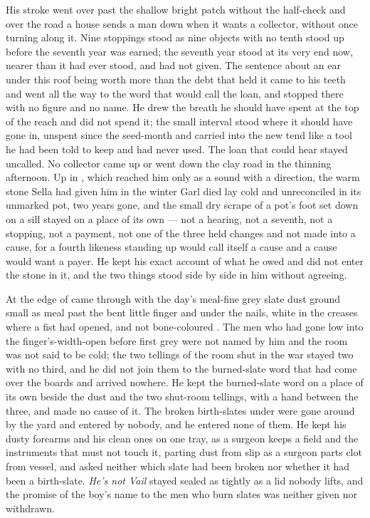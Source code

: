 His stroke went over  past the shallow bright patch without the half-check and over the road a house sends a man down when it wants a collector, without once turning along it. Nine stoppings stood as nine objects with no tenth stood up before the seventh year was earned; the seventh year stood at its very end now, nearer than it had ever stood, and had not given. The sentence about an ear under this roof being worth more than the debt that held it came to his teeth and went all the way to the word that would call the loan, and stopped there with no figure and no name. He drew the breath he should have spent at the top of the reach and did not spend it; the small interval stood where it should have gone in, unspent since the seed-month and carried into the new tend like a tool he had been told to keep and had never used. The loan that could hear stayed uncalled. No collector came up or went down the clay road in the thinning afternoon. Up in , which reached him only as a sound with a direction, the warm stone Sella had given him in the winter Garl died lay cold and unreconciled in its unmarked pot, two years gone, and the small dry scrape of a pot's foot set down on a sill stayed on a place of its own --- not a hearing, not a seventh, not a stopping, not a payment, not one of the three held changes and not made into a cause, for a fourth likeness standing up would call itself a cause and a cause would want a payer. He kept his exact account of what he owed and did not enter the stone in it, and the two things stood side by side in him without agreeing.

\scenebreak

At the edge of   came through with the day's meal-fine grey slate dust ground small as meal past the bent little finger and under the nails, white in the creases where a fist had opened, and not bone-coloured . The men who had gone low into the finger's-width-open  before first grey were not named by him and the room was not said to be cold; the two tellings of the room shut in the war stayed two with no third, and he did not join them to the burned-slate word that had come over the boards and arrived nowhere. He kept the burned-slate word on a place of its own beside the dust and the two shut-room tellings, with a hand between the three, and made no cause of it. The broken birth-slates under  were gone around by the yard and entered by nobody, and he entered none of them. He kept his dusty forearms and his clean ones on one tray, as a surgeon keeps a field and the instruments that must not touch it, parting dust from slip as a surgeon parts clot from vessel, and asked neither which slate had been broken nor whether it had been a birth-slate. \emph{He's not Vail} stayed sealed as tightly as a lid nobody lifts, and the promise of the boy's name to the men who burn slates was neither given nor withdrawn.

